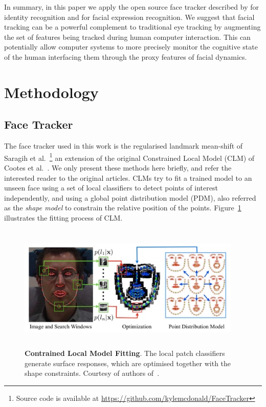 \documentclass[]{article}
\begin{document}
In summary, in this paper we apply the open source face tracker described by \cite{saragih2011deformable} for identity
recognition and for facial expression recognition. We suggest that facial tracking can be a powerful complement to
traditional eye tracking  by augmenting the set of features being tracked during human computer interaction. This  can
potentially allow computer systems to more precisely monitor the cognitive state of the human interfacing them through
the proxy features of facial dynamics.


\section{Methodology}


\subsection{Face Tracker}
The face tracker used in this work is the regularised landmark mean-shift of Saragih et
al.~\cite{saragih2011deformable}\footnote{Source code is available at
  \url{https://github.com/kylemcdonald/FaceTracker}} an extension of
the original Constrained Local Model (CLM) of Cootes et al.~\cite{cristinacce2006feature}. We only present these methods
here briefly, and refer the interested reader to the original articles. CLMs try to fit a trained model to an unseen
face using a set of local classifiers to detect points of interest independently, and using a global point distribution model (PDM),
also referred as the \textit{shape model} to constrain the relative position of the points. Figure~\ref{fig:CLM}
illustrates the fitting process of CLM.

\begin{figure}[htbp]
  \centering
  \includegraphics[width=0.95\textwidth,height=60mm]{figures/CLM.png}
  \caption{\textbf{Contrained Local Model Fitting}. The local patch classifiers generate surface responses, which are
  optimised together with the shape constraints. Courtesy of authors of~\cite{saragih2011deformable}.}
  \label{fig:CLM}
\end{figure}
\end{document}
